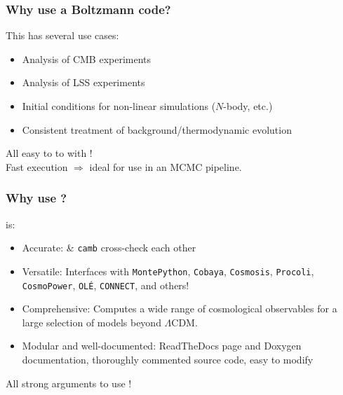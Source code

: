 \begin{frame}[fragile]
	\frametitle{Why use a Boltzmann code?}
	This has several use cases:
	\vspace{0.5\baselineskip}
	\begin{itemize}
		\item Analysis of CMB experiments
		\item Analysis of LSS experiments
		\item Initial conditions for non-linear simulations ($N$-body, etc.)
		\item Consistent treatment of background/thermodynamic evolution
	\end{itemize}
	All easy to to with {\Red \CLASS{}}!\\
		\vspace{\baselineskip}
	Fast execution $\Rightarrow$ ideal for use in an MCMC pipeline.

\end{frame}

\begin{frame}[fragile]
	\frametitle{Why use \CLASS{}?}
	\CLASS{} is:
	\vspace{0.5\baselineskip}
	\begin{itemize}
		\item Accurate: \CLASS{} \& \texttt{camb} cross-check each other
		\item Versatile: Interfaces with \texttt{MontePython}, \texttt{Cobaya}, \texttt{Cosmosis}, \texttt{Procoli}, \texttt{CosmoPower}, \texttt{OL\'E}, \texttt{CONNECT}, and others!
		\item Comprehensive: Computes a wide range of cosmological observables for a large selection of models beyond $\Lambda$CDM.
		\item Modular and well-documented: ReadTheDocs page and Doxygen documentation, thoroughly commented source code, easy to modify
	\end{itemize}
	All strong arguments to use {\Red \CLASS{}}!\\

\end{frame}

